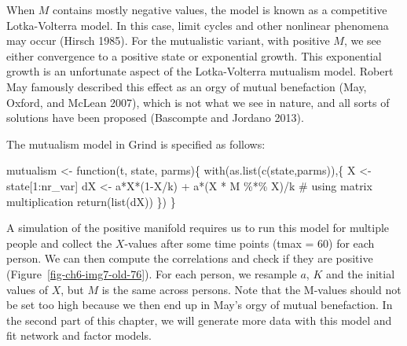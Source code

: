 \documentclass[
  a4paper,
  DIV=11,
  numbers=noendperiod,
  oneside]{scrreprt}
\newenvironment{Shaded}{\begin{snugshade}}{\end{snugshade}}
\newcommand{\CommentTok}[1]{\textcolor[rgb]{0.37,0.37,0.37}{#1}}
\newcommand{\ControlFlowTok}[1]{\textcolor[rgb]{0.00,0.23,0.31}{#1}}
\newcommand{\DecValTok}[1]{\textcolor[rgb]{0.68,0.00,0.00}{#1}}
\newcommand{\FunctionTok}[1]{\textcolor[rgb]{0.28,0.35,0.67}{#1}}
\newcommand{\NormalTok}[1]{\textcolor[rgb]{0.00,0.23,0.31}{#1}}
\newcommand{\OtherTok}[1]{\textcolor[rgb]{0.00,0.23,0.31}{#1}}
\newcommand{\SpecialCharTok}[1]{\textcolor[rgb]{0.37,0.37,0.37}{#1}}
\begin{document}
When \(M\) contains mostly negative values, the model is known as a
competitive Lotka-Volterra model. In this case, limit cycles and other
nonlinear phenomena may occur (Hirsch 1985). For the mutualistic
variant, with positive \(M\), we see either convergence to a positive
state or exponential growth. This exponential growth is an unfortunate
aspect of the Lotka-Volterra mutualism model. Robert May famously
described this effect as an orgy of mutual benefaction (May, Oxford, and
McLean 2007), which is not what we see in nature, and all sorts of
solutions have been proposed (Bascompte and Jordano 2013).

The mutualism model in Grind is specified as follows:

\begin{Shaded}
\begin{Highlighting}[]
\NormalTok{mutualism }\OtherTok{\textless{}{-}} \ControlFlowTok{function}\NormalTok{(t, state, parms)\{}
  \FunctionTok{with}\NormalTok{(}\FunctionTok{as.list}\NormalTok{(}\FunctionTok{c}\NormalTok{(state,parms)),\{}
\NormalTok{    X }\OtherTok{\textless{}{-}}\NormalTok{ state[}\DecValTok{1}\SpecialCharTok{:}\NormalTok{nr\_var]}
\NormalTok{    dX }\OtherTok{\textless{}{-}}\NormalTok{ a}\SpecialCharTok{*}\NormalTok{X}\SpecialCharTok{*}\NormalTok{(}\DecValTok{1}\SpecialCharTok{{-}}\NormalTok{X}\SpecialCharTok{/}\NormalTok{k) }\SpecialCharTok{+}\NormalTok{ a}\SpecialCharTok{*}\NormalTok{(X }\SpecialCharTok{*}\NormalTok{ M }\SpecialCharTok{\%*\%}\NormalTok{ X)}\SpecialCharTok{/}\NormalTok{k }\CommentTok{\# using matrix multiplication}
    \FunctionTok{return}\NormalTok{(}\FunctionTok{list}\NormalTok{(dX))}
\NormalTok{  \})}
\NormalTok{\}}
\end{Highlighting}
\end{Shaded}

A simulation of the positive manifold requires us to run this model for
multiple people and collect the \(X\)-values after some time points
(tmax = 60) for each person. We can then compute the correlations and
check if they are positive (Figure~\ref{fig-ch6-img7-old-76}). For each
person, we resample \(a\), \(K\) and the initial values of \(X\), but
\(M\) is the same across persons. Note that the M-values should not be
set too high because we then end up in May's orgy of mutual benefaction.
In the second part of this chapter, we will generate more data with this
model and fit network and factor models.
\end{document}
